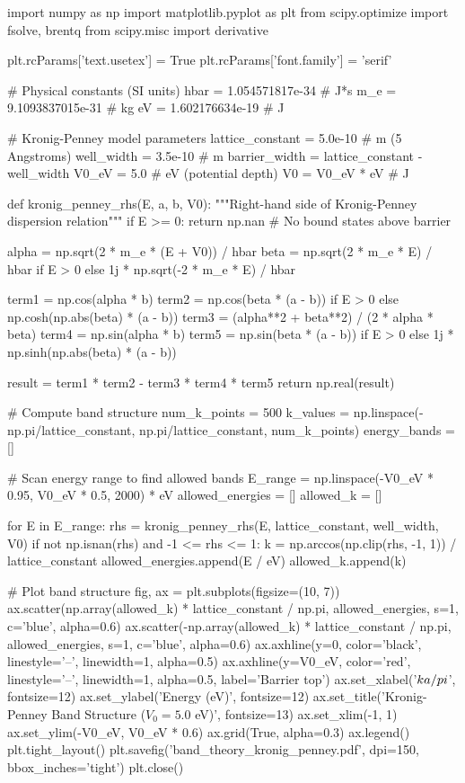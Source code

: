 \documentclass[11pt,a4paper]{article}
\begin{document}
\begin{pycode}
import numpy as np
import matplotlib.pyplot as plt
from scipy.optimize import fsolve, brentq
from scipy.misc import derivative

plt.rcParams['text.usetex'] = True
plt.rcParams['font.family'] = 'serif'

# Physical constants (SI units)
hbar = 1.054571817e-34  # J*s
m_e = 9.1093837015e-31  # kg
eV = 1.602176634e-19    # J

# Kronig-Penney model parameters
lattice_constant = 5.0e-10  # m (5 Angstroms)
well_width = 3.5e-10        # m
barrier_width = lattice_constant - well_width
V0_eV = 5.0                 # eV (potential depth)
V0 = V0_eV * eV             # J

def kronig_penney_rhs(E, a, b, V0):
    """Right-hand side of Kronig-Penney dispersion relation"""
    if E >= 0:
        return np.nan  # No bound states above barrier

    alpha = np.sqrt(2 * m_e * (E + V0)) / hbar
    beta = np.sqrt(2 * m_e * E) / hbar if E > 0 else 1j * np.sqrt(-2 * m_e * E) / hbar

    term1 = np.cos(alpha * b)
    term2 = np.cos(beta * (a - b)) if E > 0 else np.cosh(np.abs(beta) * (a - b))
    term3 = (alpha**2 + beta**2) / (2 * alpha * beta)
    term4 = np.sin(alpha * b)
    term5 = np.sin(beta * (a - b)) if E > 0 else 1j * np.sinh(np.abs(beta) * (a - b))

    result = term1 * term2 - term3 * term4 * term5
    return np.real(result)

# Compute band structure
num_k_points = 500
k_values = np.linspace(-np.pi/lattice_constant, np.pi/lattice_constant, num_k_points)
energy_bands = []

# Scan energy range to find allowed bands
E_range = np.linspace(-V0_eV * 0.95, V0_eV * 0.5, 2000) * eV
allowed_energies = []
allowed_k = []

for E in E_range:
    rhs = kronig_penney_rhs(E, lattice_constant, well_width, V0)
    if not np.isnan(rhs) and -1 <= rhs <= 1:
        k = np.arccos(np.clip(rhs, -1, 1)) / lattice_constant
        allowed_energies.append(E / eV)
        allowed_k.append(k)

# Plot band structure
fig, ax = plt.subplots(figsize=(10, 7))
ax.scatter(np.array(allowed_k) * lattice_constant / np.pi, allowed_energies,
           s=1, c='blue', alpha=0.6)
ax.scatter(-np.array(allowed_k) * lattice_constant / np.pi, allowed_energies,
           s=1, c='blue', alpha=0.6)
ax.axhline(y=0, color='black', linestyle='--', linewidth=1, alpha=0.5)
ax.axhline(y=V0_eV, color='red', linestyle='--', linewidth=1, alpha=0.5, label='Barrier top')
ax.set_xlabel('$ka/\\pi$', fontsize=12)
ax.set_ylabel('Energy (eV)', fontsize=12)
ax.set_title('Kronig-Penney Band Structure ($V_0 = 5.0$ eV)', fontsize=13)
ax.set_xlim(-1, 1)
ax.set_ylim(-V0_eV, V0_eV * 0.6)
ax.grid(True, alpha=0.3)
ax.legend()
plt.tight_layout()
plt.savefig('band_theory_kronig_penney.pdf', dpi=150, bbox_inches='tight')
plt.close()


\end{pycode}
\end{document}
